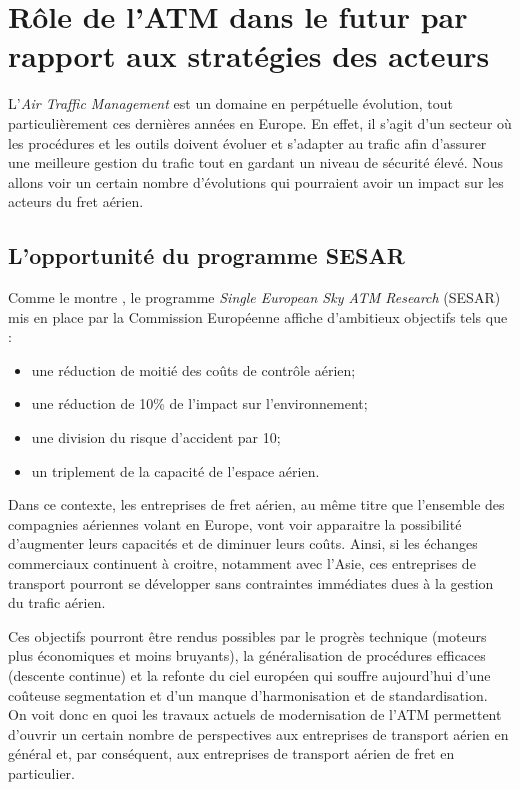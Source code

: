 
\section{Rôle de l'ATM dans le futur par rapport aux stratégies des acteurs }

L'\textit{Air Traffic Management} est un domaine en perpétuelle évolution, tout particulièrement ces dernières années en Europe. En effet, il s'agit d'un secteur où les procédures et les outils doivent évoluer et s'adapter au trafic afin d'assurer une meilleure gestion du trafic tout en gardant un niveau de sécurité élevé. Nous allons voir un certain nombre d'évolutions qui pourraient avoir un impact sur les acteurs du fret aérien.

\subsection{L'opportunité du programme SESAR}

Comme le montre \cite{52008DC0750}, le programme \textit{Single European Sky ATM Research} (SESAR) mis en place par la Commission Européenne affiche d'ambitieux objectifs tels que :
\begin{itemize}
\item une réduction de moitié des coûts de contrôle aérien;
\item une réduction de 10\% de l'impact sur l'environnement;
\item une division du risque d'accident par 10;
\item un triplement de la capacité de l'espace aérien.
\end{itemize}

Dans ce contexte, les entreprises de fret aérien, au même titre que l'ensemble des compagnies aériennes volant en Europe, vont voir apparaitre la possibilité d'augmenter leurs capacités et de diminuer leurs coûts. Ainsi, si les échanges commerciaux continuent à croitre, notamment avec l'Asie, ces entreprises de transport pourront se développer sans contraintes immédiates dues à la gestion du trafic aérien.

Ces objectifs pourront être rendus possibles par le progrès technique (moteurs plus économiques et moins bruyants), la généralisation de procédures efficaces (descente continue) et la refonte du ciel européen qui souffre aujourd'hui d'une coûteuse segmentation et d'un manque d'harmonisation et de standardisation.\\

On voit donc en quoi les travaux actuels de modernisation de l'ATM permettent d'ouvrir un certain nombre de perspectives aux entreprises de transport aérien en général et, par conséquent, aux entreprises de transport aérien de fret en particulier.

